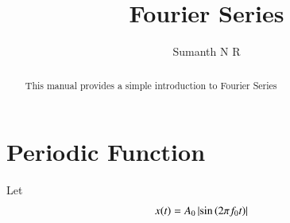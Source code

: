 \documentclass[journal,12pt,twocolumn]{IEEEtran}
\begin{document}
\let\StandardTheFigure\thefigure
\renewcommand{\thefigure}{\theproblem}


\vspace{3cm}

\title{Fourier Series}
\author{Sumanth N R}
\maketitle
\tableofcontents

\renewcommand{\thefigure}{\theenumi}
\renewcommand{\thetable}{\theenumi}

\bigskip

\begin{abstract}
This manual provides a simple introduction to Fourier Series
\end{abstract}


\section{Periodic Function}
Let 
\begin{align}
	x(t) &= A_0\left\vert\sin\left(2\pi f_0 t\right)\right\vert
	\label{eq:10-orig-diff-def}
\end{align}
\end{document}
